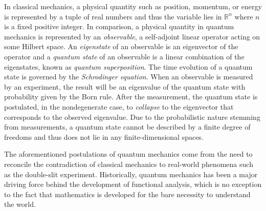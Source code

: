 \begin{exm}
  \label{exm:quantumMechanics}  
  In classical mechanics, a physical quantity
  such as position, momentum, or energy
  is represented by a tuple of real numbers
  and thus the variable lies in $\mathbb{R}^n$
  where $n$ is a fixed positive integer.
  In comparison,
  a physical quantity in quantum mechanics 
  is represented by an \emph{observable},
  a self-adjoint linear operator acting on some Hilbert space.
  An \emph{eigenstate} of an observable
  is an eigenvector of the operator
  and a \emph{quantum state} of an observable
  is a linear combination of the eigenstates,
  known as \emph{quantum superposition}.
  The time evolution of a quantum state
  is governed by the \emph{Schrodinger equation}. 
  When an observable is measured by an experiment, 
  the result will be an eigenvalue of the quantum state
  with probability given by the Born rule.
  After the measurement,
  the quantum state is postulated, in the nondegenerate case,
  to \emph{collapse} to the eigenvector that corresponds
  to the observed eigenvalue.
  Due to the probabilistic nature stemming from measurements,
   a quantum state cannot be described by
   a finite degree of freedoms
   and thus does not lie in any finite-dimensional spaces.

  The aforementioned postulations of quantum mechanics
   come from the need to reconcile
   the contradiction of classical mechanics
   to real-world phenomena
   such as the double-slit experiment. 
  Historically, quantum mechanics has been a major driving force
   behind the development of functional analysis, 
   which is no exception to the fact
   that mathematics is developed
   for the bare necessity to understand the world.
\end{exm}

